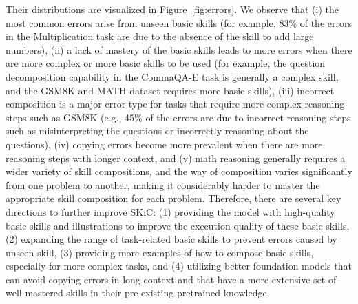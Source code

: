 Their distributions are visualized in Figure~\ref{fig:errors}. We observe that (i) the most common errors arise from unseen basic skills (for example, 83\% of the errors in the Multiplication task are due to the absence of the skill to add large numbers), (ii) a lack of mastery of the basic skills leads to more errors when there are more complex or more basic skills to be used (for example, the question decomposition capability in the CommaQA-E task is generally a complex skill, and the GSM8K and MATH dataset requires more basic skills), (iii) incorrect composition is a major error type for tasks that require more complex reasoning steps such as GSM8K (e.g., 45\% of the errors are due to incorrect reasoning steps such as misinterpreting the questions or incorrectly reasoning about the questions), (iv) copying errors become more prevalent when there are more reasoning steps with longer context, and (v) math reasoning generally requires a wider variety of skill compositions, and the way of composition varies significantly from one problem to another, making it considerably harder to master the appropriate skill composition for each problem. Therefore, there are several key directions to further improve SKiC: (1) providing the model with high-quality basic skills and illustrations to improve the execution quality of these basic skills, (2) expanding the range of task-related basic skills to prevent errors caused by unseen skill, (3) providing more examples of how to compose basic skills, especially for more complex tasks, and (4) utilizing better foundation models that can avoid copying errors in long context and that have a more extensive set of well-mastered skills in their pre-existing pretrained knowledge.
